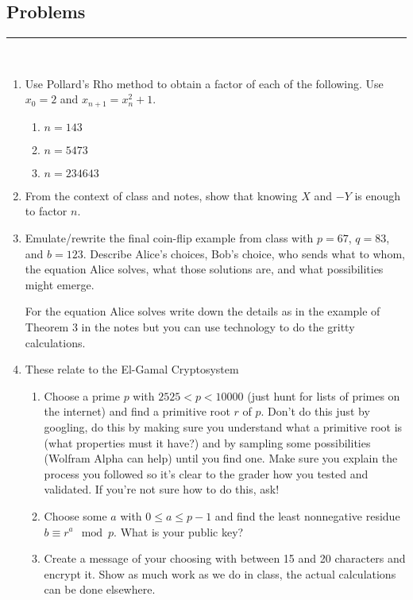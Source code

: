 \documentclass[class=article, crop=false]{standalone}
\begin{document}
\begin{enumerate}[1.]
\end{enumerate}

\subsection{Problems}
\rule{\textwidth}{1pt}\\
\begin{enumerate}
\item
	Use Pollard's Rho method
	to obtain a factor of each of the following.
	Use $x_0=2$ and $x_{n+1}=x_n^2+1$.

	\begin{enumerate}

	\item
		$n=143$

	\item
		$n=5473$

	\item
		$n = 234643$

	\end{enumerate}


\item
	From the context of class and notes,
	show that knowing $X$ and $-Y$ is enough to factor $n$.

\item
	Emulate/rewrite the final coin-flip example from class
	with $p=67$, $q=83$, and $b=123$.
	Describe Alice's choices, Bob's choice,
	who sends what to whom,
	the equation Alice solves,
	what those solutions are,
	and what possibilities might emerge.

	For the equation Alice solves
	write down the details as in the example of Theorem 3
	in the notes
	but you can use technology to do the gritty calculations.

\item
	These relate to the El-Gamal Cryptosystem
	\begin{enumerate}
	\item
		Choose a prime $p$ with $2525<p<10000$
		(just hunt for lists of primes on the internet)
		and find a primitive root $r$ of $p$.
		Don't do this just by googling,
		do this by making sure you understand what a primitive root is
		(what properties must it have?)
		and by sampling some possibilities (Wolfram Alpha can help)
		until you find one.
		Make sure you explain the process you followed
		so it's clear to the grader how you tested and validated.
		If you're not sure how to do this, ask!

	\item
		Choose some $a$ with $0\leq a\leq p-1$ and find the least nonnegative
		residue $b\equiv r^a\mod p$.
		What is your public key?

	\item
		Create a message of your choosing with between 15 and 20 characters
		and encrypt it.
		Show as much work as we do in class,
		the actual calculations can be done elsewhere.

\end{enumerate}
	
	\end{enumerate}
\end{document}
